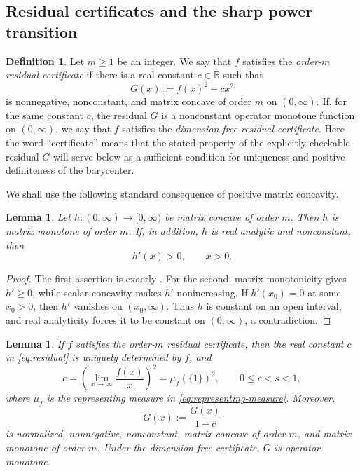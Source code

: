 \documentclass[11pt]{amsart}
\newtheorem{lemma}[theorem]{Lemma}
\theoremstyle{definition}
\newtheorem{definition}[theorem]{Definition}
\theoremstyle{remark}
\begin{document}
	\subsection{Residual certificates and the sharp power transition}
	
\begin{definition}\label{def:certificate}
		Let $m\ge1$ be an integer.  We say that $f$ satisfies the
		\emph{order-$m$ residual certificate} if there is a real constant
		$c\in\mathbb R$ such that
		\begin{equation}\label{eq:residual}
			G(x):=f(x)^2-cx^2
		\end{equation}
		is nonnegative, nonconstant, and matrix concave of order $m$ on
		$(0,\infty)$.  If, for the same constant $c$, the residual $G$ is a
		nonconstant operator monotone function on $(0,\infty)$, we say that $f$
		satisfies the \emph{dimension-free residual certificate}.  Here the word
		``certificate'' means that the stated property of the explicitly
		checkable residual $G$ will serve below as a sufficient condition for
		uniqueness and positive definiteness of the barycenter.
\end{definition}
	
We shall use the following standard consequence of positive matrix
concavity.

\begin{lemma}
	\label{lem:positive-matrix-concavity}
	Let $h:(0,\infty)\to[0,\infty)$ be matrix concave of order $m$.
	Then $h$ is matrix monotone of order $m$.  If, in addition, $h$
	is real analytic and nonconstant, then
	\[
	h'(x)>0,\qquad x>0.
	\]
\end{lemma}

\begin{proof}
	The first assertion is exactly
	\cite[Theorem~2.3]{Hansen2013}.  For the second, matrix monotonicity
	gives $h'\ge0$, while scalar concavity makes $h'$ nonincreasing.
	If $h'(x_0)=0$ at some $x_0>0$, then $h'$ vanishes on
	$(x_0,\infty)$.  Thus $h$ is constant on an open interval, and real
	analyticity forces it to be constant on $(0,\infty)$, a contradiction.
\end{proof}
	
	\begin{lemma}
		\label{lem:certificate-constant}
	 If $f$ satisfies the order-$m$ residual certificate, then the real
		constant $c$ in \eqref{eq:residual} is uniquely determined by $f$, and
		\begin{equation}\label{eq:canonical-c}
			c=\left(\lim_{x\to\infty}\frac{f(x)}{x}\right)^2
			=\mu_f(\{1\})^2,
			\qquad 0\le c<s<1,
		\end{equation}
		where $\mu_f$ is the representing measure in
		\eqref{eq:representing-measure}.  Moreover,
		\begin{equation}\label{eq:normalized-residual}
			\widetilde G(x):=\frac{G(x)}{1-c}
		\end{equation}
		is normalized, nonnegative, nonconstant, matrix concave of order $m$, and
		matrix monotone of order $m$.  Under the dimension-free certificate,
		$\widetilde G$ is operator monotone.
	\end{lemma}
	
\end{document}
